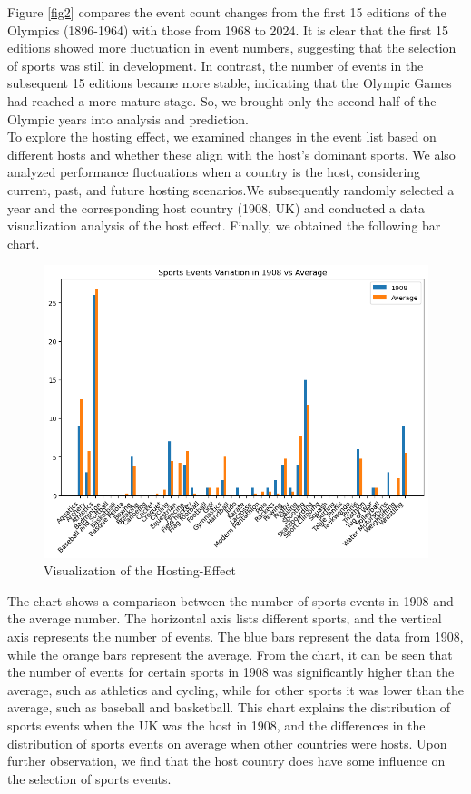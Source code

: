 \documentclass[12pt]{article}
\begin{document}
Figure \ref{fig2} compares the event count changes from the first 15 editions of the Olympics (1896-1964) with those from 1968 to 2024. It is clear that the first 15 editions showed more fluctuation in event numbers, suggesting that the selection of sports was still in development. In contrast, the number of events in the subsequent 15 editions became more stable, indicating that the Olympic Games had reached a more mature stage. So, we brought only the second half of the Olympic years into analysis and prediction.\\

To explore the hosting effect, we examined changes in the event list based on different hosts and whether these align with the host's dominant sports. We also analyzed performance fluctuations when a country is the host, considering current, past, and future hosting scenarios.We subsequently randomly selected a year and the corresponding host country (1908, UK) and conducted a data visualization analysis of the host effect. Finally, we obtained the following bar chart.\\

\begin{figure}[h] 
\centering
\includegraphics[width=12cm]{figure/sport_events_variation_1908.png.png}
\caption{Visualization of the Hosting-Effect} \label{fig3}
\end{figure}

The chart shows a comparison between the number of sports events in 1908 and the average number. The horizontal axis lists different sports, and the vertical axis represents the number of events. The blue bars represent the data from 1908, while the orange bars represent the average. From the chart, it can be seen that the number of events for certain sports in 1908 was significantly higher than the average, such as athletics and cycling, while for other sports it was lower than the average, such as baseball and basketball. This chart explains the distribution of sports events when the UK was the host in 1908, and the differences in the distribution of sports events on average when other countries were hosts. Upon further observation, we find that the host country does have some influence on the selection of sports events.\\
\end{document}
